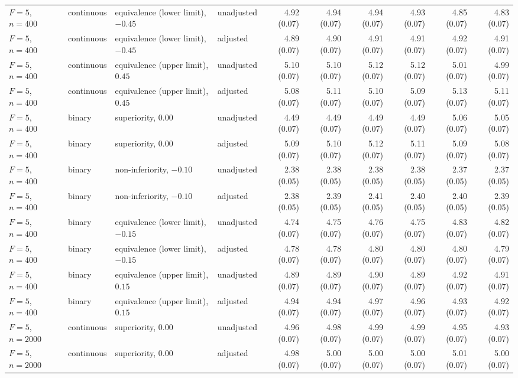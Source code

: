 \documentclass[12pt,a4paper]{article}
\theoremstyle{definition}
\theoremstyle{remark}\newtheorem{remark}{Remark}
\numberwithin{equation}{section}
\begin{document}
\begin{landscape}
\begin{singlespace}
\begin{longtable}{@{}llllrrrrrr@{}}
$F=5$, $n=400$ & continuous & equivalence (lower limit), $-0.45$ & unadjusted & 4.92 (0.07) & 4.94 (0.07) & 4.94 (0.07) & 4.93 (0.07) & 4.85 (0.07) & 4.83 (0.07)\\
$F=5$, $n=400$ & continuous & equivalence (lower limit), $-0.45$ & adjusted & 4.89 (0.07) & 4.90 (0.07) & 4.91 (0.07) & 4.91 (0.07) & 4.92 (0.07) & 4.91 (0.07)\\
$F=5$, $n=400$ & continuous & equivalence (upper limit), $0.45$ & unadjusted & 5.10 (0.07) & 5.10 (0.07) & 5.12 (0.07) & 5.12 (0.07) & 5.01 (0.07) & 4.99 (0.07)\\
$F=5$, $n=400$ & continuous & equivalence (upper limit), $0.45$ & adjusted & 5.08 (0.07) & 5.11 (0.07) & 5.10 (0.07) & 5.09 (0.07) & 5.13 (0.07) & 5.11 (0.07)\\
$F=5$, $n=400$ & binary & superiority, $0.00$ & unadjusted & 4.49 (0.07) & 4.49 (0.07) & 4.49 (0.07) & 4.49 (0.07) & 5.06 (0.07) & 5.05 (0.07)\\
$F=5$, $n=400$ & binary & superiority, $0.00$ & adjusted & 5.09 (0.07) & 5.10 (0.07) & 5.12 (0.07) & 5.11 (0.07) & 5.09 (0.07) & 5.08 (0.07)\\
$F=5$, $n=400$ & binary & non-inferiority, $-0.10$ & unadjusted & 2.38 (0.05) & 2.38 (0.05) & 2.38 (0.05) & 2.38 (0.05) & 2.37 (0.05) & 2.37 (0.05)\\
$F=5$, $n=400$ & binary & non-inferiority, $-0.10$ & adjusted & 2.38 (0.05) & 2.39 (0.05) & 2.41 (0.05) & 2.40 (0.05) & 2.40 (0.05) & 2.39 (0.05)\\
$F=5$, $n=400$ & binary & equivalence (lower limit), $-0.15$ & unadjusted & 4.74 (0.07) & 4.75 (0.07) & 4.76 (0.07) & 4.75 (0.07) & 4.83 (0.07) & 4.82 (0.07)\\
$F=5$, $n=400$ & binary & equivalence (lower limit), $-0.15$ & adjusted & 4.78 (0.07) & 4.78 (0.07) & 4.80 (0.07) & 4.80 (0.07) & 4.80 (0.07) & 4.79 (0.07)\\
$F=5$, $n=400$ & binary & equivalence (upper limit), $0.15$ & unadjusted & 4.89 (0.07) & 4.89 (0.07) & 4.90 (0.07) & 4.89 (0.07) & 4.92 (0.07) & 4.91 (0.07)\\
$F=5$, $n=400$ & binary & equivalence (upper limit), $0.15$ & adjusted & 4.94 (0.07) & 4.94 (0.07) & 4.97 (0.07) & 4.96 (0.07) & 4.93 (0.07) & 4.92 (0.07)\\
$F=5$, $n=2000$ & continuous & superiority, $0.00$ & unadjusted & 4.96 (0.07) & 4.98 (0.07) & 4.99 (0.07) & 4.99 (0.07) & 4.95 (0.07) & 4.93 (0.07)\\
$F=5$, $n=2000$ & continuous & superiority, $0.00$ & adjusted & 4.98 (0.07) & 5.00 (0.07) & 5.00 (0.07) & 5.00 (0.07) & 5.01 (0.07) & 5.00 (0.07)\\

\end{longtable}
\end{singlespace}
\end{landscape}
\end{document}
